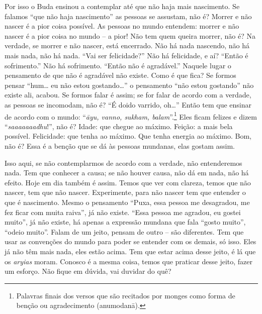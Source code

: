 Por isso o Buda ensinou a contemplar até que não haja mais
nascimento. Se falamos “que não haja nascimento” as pessoas se
assustam, não é? Morrer e não nascer é a pior coisa possível. As
pessoas no mundo entendem: morrer e não nascer é a pior coisa no mundo
– a pior! Não tem quem queira morrer, não é? Na verdade, se morrer e
não nascer, está encerrado. Não há nada nascendo, não há mais nada, não
há nada. “Vai ser felicidade?” Não há felicidade, e aí? “Então é
sofrimento.” Não há sofrimento. “Então não é agradável.” Naquele lugar
o pensamento de que não é agradável não existe. Como é que fica? Se
formos pensar “hum… eu não estou gostando…” o pensamento “não estou
gostando” não existe ali, acabou. Se formos falar é assim; se for falar
de acordo com a verdade, as pessoas se incomodam, não é? “É doido
varrido, oh…” Então tem que ensinar de acordo com o mundo:
“\textit{āyu, vanno, sukham, balam}”.\footnote{Palavras finais dos
versos que são recitados por monges como forma de benção ou
agradecimento (anumodanā).} Eles ficam felizes e dizem
“\textit{saaaaaaadhu}!”, não é? Idade: que chegue ao máximo. Feição: a
mais bela possível. Felicidade: que tenha ao máximo. Que tenha energia
ao máximo. Bom, não é? Essa é a benção que se dá às pessoas mundanas,
elas gostam assim. 

Isso aqui, se não contemplarmos de acordo com a verdade, não
entenderemos nada. Tem que conhecer a causa; se não houver causa, não
dá em nada, não há efeito. Hoje em dia também é assim. Temos que ver
com clareza, temos que não nascer, tem que não nascer. Experimente,
para não nascer tem que entender o que é nascimento. Mesmo o pensamento
“Puxa, essa pessoa me desagradou, me fez ficar com muita raiva”, já não
existe. “Essa pessoa me agradou, eu gostei muito”, já não existe, há
apenas a expressão mundana que fala “gosto muito”, “odeio muito”. Falam
de um jeito, pensam de outro – são diferentes. Tem que usar as
convenções do mundo para poder se entender com os demais, só isso. Eles
já não têm mais nada, eles estão acima. Tem que estar acima desse
jeito, é lá que os \textit{aryias} moram. Conosco é a mesma coisa,
temos que praticar desse jeito, fazer um esforço. Não fique em dúvida,
vai duvidar do quê? 

